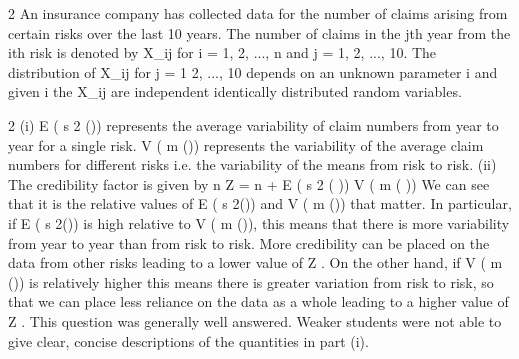 



2 An insurance company has collected data for the number of claims arising from
certain risks over the last 10 years. The number of claims in the jth year from the ith
risk is denoted by X_{ij} for i = 1, 2, ..., n and j = 1, 2, ..., 10. The distribution of X_{ij} for
j = 1 2, ..., 10 depends on an unknown parameter \theta  i and given \theta  i the X_{ij} are
independent identically distributed random variables.



2
(i)
E ( s 2 (\theta )) represents the average variability of claim numbers from year to year
for a single risk.
V ( m (\theta )) represents the variability of the average claim numbers for different
risks i.e. the variability of the means from risk to risk.
(ii)
The credibility factor is given by
n
Z =
n +
E ( s 2 ( \theta  ))
V ( m ( \theta  ))
We can see that it is the relative values of E ( s 2(\theta )) and V ( m (\theta )) that matter. In
particular, if E ( s 2(\theta )) is high relative to V ( m (\theta )), this means that there is more
variability from year to year than from risk to risk. More credibility can be
placed on the data from other risks leading to a lower value of Z .
On the other hand, if V ( m (\theta )) is relatively higher this means there is greater
variation from risk to risk, so that we can place less reliance on the data as a
whole leading to a higher value of Z .
This question was generally well answered. Weaker students were not able to
give clear, concise descriptions of the quantities in part (i).
